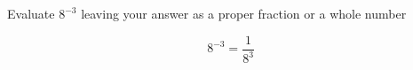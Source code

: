 \question Evaluate $8^{-3}$ leaving your answer as a proper fraction 
or a whole number
\begin{solution}
	\[
		8^{-3} = \frac{1}{8^{3}}
	\]
\end{solution}

